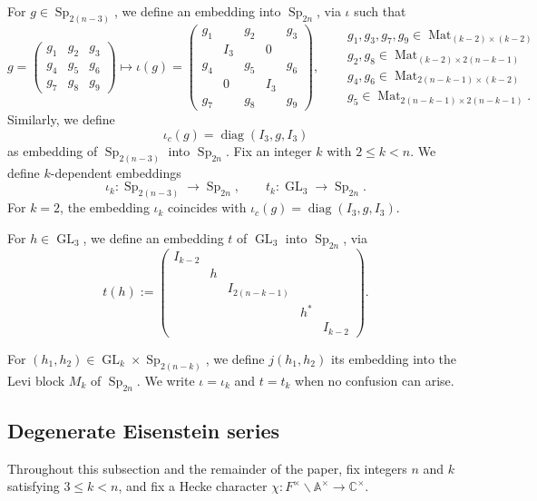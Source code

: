 \documentclass[11pt,notitlepage]{amsart}
\theoremstyle{definition}
\theoremstyle{remark}
\DeclareMathOperator{\GL}{GL}
\DeclareMathOperator{\Sp}{Sp}
\DeclareMathOperator{\diag}{diag}
\DeclareMathOperator{\Mat}{Mat}
\begin{document}
For $g\in \Sp_{2(n-3)}$, we define an embedding into $\Sp_{2n}$, via $\iota$ such that
\begin{equation}\label{embed}
  g = \begin{pmatrix}
    g_1&g_2&g_3\\
    g_4&g_5&g_6\\
    g_7&g_8&g_9
  \end{pmatrix} \mapsto \iota(g)=\begin{pmatrix}
    g_1&&g_2&&g_3\\
    &I_3&&0&\\
    g_4&&g_5&&g_6\\
    &0&&I_3&\\
    g_7&&g_8&&g_9
  \end{pmatrix},\quad \begin{aligned}
    &g_1,g_3,g_7,g_9\in \Mat_{(k-2)\times (k-2)}\\
    &g_2,g_8 \in \Mat_{(k-2)\times 2(n-k-1)}\\
    &g_4,g_6 \in \Mat_{2(n-k-1)\times (k-2)}\\
    &g_5 \in \Mat_{2(n-k-1)\times 2(n-k-1)}.
  \end{aligned}
\end{equation} 
Similarly, we define \[\iota_c(g)=\diag(I_3,g,I_3)\] as embedding of $\Sp_{2(n-3)}$ into $\Sp_{2n}$.
Fix an integer \(k\) with \(2\leq k<n\). We define
\(k\)-dependent embeddings
\[
\iota_k:\Sp_{2(n-3)}\longrightarrow\Sp_{2n},
\qquad
t_k:\GL_3\longrightarrow\Sp_{2n}.
\]
For \(k=2\), the embedding \(\iota_k\) coincides with
$\iota_c(g)=\diag(I_3,g,I_3)$.

For $h\in\GL_3$, we define an embedding $t$ of $\GL_3$ into $\Sp_{2n}$, via \begin{equation}\label{gl3em}
    t(h) := \begin{pmatrix}
    I_{k-2}&&&&\\
    &h&&&\\
    &&I_{2(n-k-1)}&&\\
    &&&h^\ast&\\
    &&&&I_{k-2}
  \end{pmatrix}.
\end{equation}

For $(h_1,h_2)\in \GL_k\times \Sp_{2(n-k)}$, we define $j(h_1,h_2)$ its embedding into the Levi block $M_k$ of $\Sp_{2n}$. We write $\iota=\iota_k$ and $t=t_k$ when no confusion can arise.

\subsection{Degenerate Eisenstein series}
Throughout this subsection and the remainder of the paper, fix
integers $n$ and $k$ satisfying $3\le k<n$, and fix a Hecke character $\chi:F^\times\backslash\mathbb A^\times\longrightarrow\mathbb C^\times$.
\end{document}
